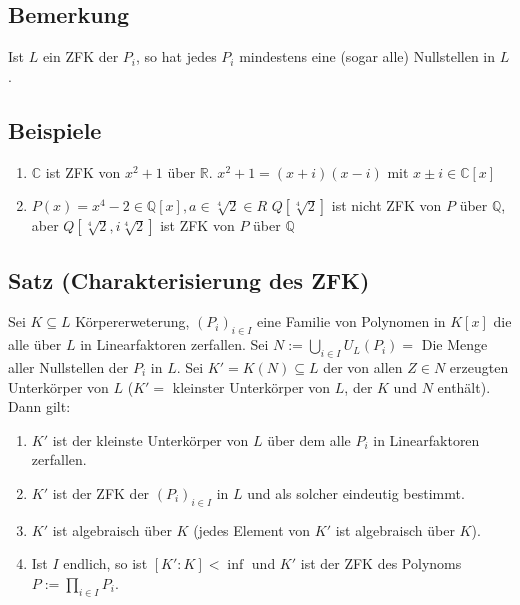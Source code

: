 \documentclass[12pt,a4paper,ngerman]{scrreprt}
\begin{document}
\subsection{Bemerkung}
Ist $L$ ein ZFK der $P_i$, so hat jedes $P_i$ mindestens eine (sogar alle) Nullstellen in $L$.


\subsection{Beispiele}
\begin{enumerate}[(1)]
\item $\mathbb{C}$ ist ZFK von $x^2 + 1$ über $\mathbb{R}$. $x^2+1 = (x+i)(x-i)$ mit $x\pm i \in \mathbb{C}[x]$
\item $P(x) = x^4 -2 \in \mathbb{Q}[x], a \in \sqrt[4]{2} \in R$
$Q[\sqrt[4]{2}]$ ist nicht ZFK von $P$ über $\mathbb{Q}$, 
aber $Q[\sqrt[4]{2}, i \sqrt[4]{2}]$ ist ZFK von $P$ über $\mathbb{Q}$
\end{enumerate}

\subsection{Satz (Charakterisierung des ZFK)}
Sei $K \subseteq L$ Körpererweterung, $(P_i)_{i \in I}$ eine Familie von Polynomen in $K[x]$
die alle über $L$ in Linearfaktoren zerfallen.
Sei $N:= \bigcup_{i\in I}{ U_L (P_i)} =$ 
Die Menge aller Nullstellen der $P_i$ in $L$.
Sei $K' = K(N) \subseteq L$ der von allen $Z \in N$ erzeugten Unterkörper von $L$
($K' =$ kleinster Unterkörper von $L$, der $K$ und $N$ enthält).
Dann gilt:
\begin{enumerate}[(1)]
\item $K'$ ist der kleinste Unterkörper von $L$ über dem alle $P_i$ in Linearfaktoren zerfallen.
\item $K'$ ist der ZFK der $(P_i)_{i\in I}$ in $L$ und als solcher eindeutig bestimmt.
\item $K'$ ist algebraisch über $K$ (jedes Element von $K'$ ist algebraisch über $K$).
\item Ist $I$ endlich, so ist $[K':K] < \inf$ und $K'$ ist der ZFK des Polynoms
$P := \prod_{i\in I}{P_i}$.
\end{enumerate}
\end{document}
